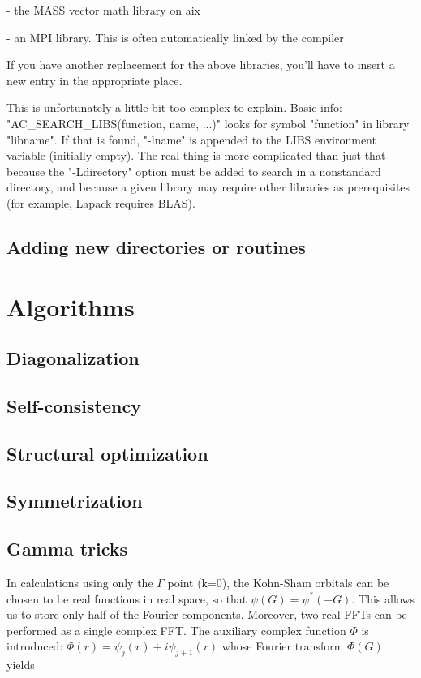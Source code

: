 \documentclass[12pt,a4paper]{article}
\begin{document}
\begin{enumerate}
- the MASS vector math library on aix

- an MPI library. This is often automatically linked by the compiler

If you have another replacement for the above libraries, you'll have
to insert a new entry in the appropriate place.

This is unfortunately a little bit too complex to explain.
Basic info: "AC\_SEARCH\_LIBS(function, name, ...)" looks for symbol
"function" in library "libname".  If that is found, "-lname" is
appended to the LIBS environment variable (initially empty).
The real thing is more complicated than just that because the
"-Ldirectory" option must be added to search in a nonstandard
directory, and because a given library may require other libraries as
prerequisites (for example, Lapack requires BLAS).
\end{enumerate}

\subsection{Adding new directories or routines}

\section{ Algorithms}
\subsection{Diagonalization}
\subsection{Self-consistency}
\subsection{Structural optimization}
\subsection{Symmetrization}
\subsection{Gamma tricks}

In calculations using only the $\Gamma$ point (k=0),
the Kohn-Sham orbitals can be chosen to be real functions in 
real space, so that 
$
  \psi(G) = \psi^*(-G).
$
This allows us to store only half of the Fourier components.
Moreover, two real FFTs can be performed as a single complex FFT.
The auxiliary complex function $\Phi$ is introduced:
$
    \Phi(r) = \psi_j(r)+ i \psi_{j+1}(r)
$
whose Fourier transform $\Phi(G)$ yields
\end{document}
